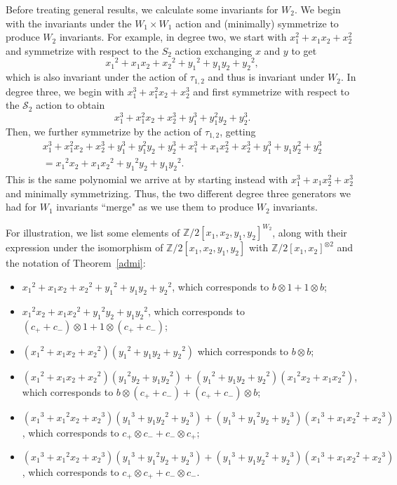 \documentclass{article}
\theoremstyle{plain}
\theoremstyle{definition}
\newcommand{\Z}{\mathbb{Z}}
\newcommand{\si}{\mathcal{S}}
\begin{document}
Before treating general results, we calculate some invariants for $W_2$.  
We begin with the invariants under the $W_1 \times W_1$ action and (minimally) symmetrize to produce $W_2$ invariants.  
For example, in degree two, we start with $ x_1^2 + x_1x_2+x_2^2$
and symmetrize with respect to the $S_2$ action  exchanging $x$ and $y$ to get
\[ {x_1}^2+x_1x_2+{x_2}^2 + {y_1}^2+y_1y_2+{y_2}^2, \]
which is also invariant under the action of $\tau_{1,2}$ 
and thus is invariant under $W_2$.
In degree three, we begin with $ x_1^3 + x_1^2x_2 + x_2^3$
and first symmetrize with respect to the $\si_2$ action
 to obtain
\[  x_1^3 + x_1^2x_2 + x_2^3 + y_1^3 + y_1^2y_2+ y_2^3.\]
Then, we further symmetrize by the action of $\tau_{1,2}$, getting
\begin{multline*}
    x_1^3 + x_1^2x_2 + x_2^3 + y_1^3 + y_1^2y_2+ y_2^3 + x_1^3 + x_1x_2^2 + x_2^3 + y_1^3 + y_1y_2^2+ y_2^3 \\
    = {x_1}^2x_2+x_1{x_2}^2+{y_1}^2y_2+y_1{y_2}^2.
\end{multline*}
This is the same polynomial we arrive at by starting instead with $x_1^3+x_1x_2^2 + x_2^3$ and minimally symmetrizing. Thus, the two different degree three generators we had for $W_1$ invariants ``merge" as we
use them to produce $W_2$ invariants. 

For illustration,
we list some elements of  $\Z/2[x_1, x_2, y_1, y_2]^{W_2}$, along with their 
expression under the  isomorphism of $\Z/2[x_1, x_2, y_1, y_2]$
with $ \Z/2[x_1, x_2]^{\otimes 2}$ and the notation of Theorem~\ref{admi}:

\begin{itemize}
    \item ${x_1}^2+x_1x_2+{x_2}^2 + {y_1}^2+y_1y_2+{y_2}^2$, which corresponds to $b \otimes 1 + 1 \otimes b$;
    \item ${x_1}^2x_2+x_1{x_2}^2+{y_1}^2y_2+y_1{y_2}^2$, which corresponds to $(c_+ + c_-) \otimes 1 + 1 \otimes (c_+ + c_-)$;
    \item $({x_1}^2+x_1x_2+{x_2}^2)({y_1}^2+y_1y_2+{y_2}^2)$ which corresponds to $b \otimes b$;
    \item $({x_1}^2+x_1x_2+{x_2}^2)({y_1}^2y_2+y_1{y_2}^2)+({y_1}^2+y_1y_2+{y_2}^2)({x_1}^2x_2+x_1{x_2}^2)$, 
    which corresponds to $b \otimes (c_+ + c_-) + (c_+ + c_-) \otimes b$;
    \item $({x_1}^3+{x_1}^2x_2+{x_2}^3)({y_1}^3+y_1{y_2}^2+{y_2}^3)+({y_1}^3+{y_1}^2y_2+{y_2}^3)({x_1}^3+x_1{x_2}^2+{x_2}^3)$,
    which corresponds to $c_+ \otimes c_- + c_- \otimes c_+$;
    \item $({x_1}^3+{x_1}^2x_2+{x_2}^3)({y_1}^3+{y_1}^2y_2+{y_2}^3)+({y_1}^3+y_1{y_2}^2+{y_2}^3)({x_1}^3+x_1{x_2}^2+{x_2}^3)$,
    which corresponds to  $c_+ \otimes c_+ + c_- \otimes c_-$.
    
\end{itemize}
\end{document}
